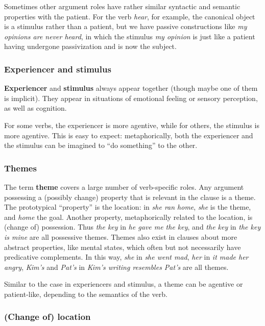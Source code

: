 \documentclass{article}
\newcommand*{\concept}[1]{\textbf{#1}}
\newcommand*{\corpus}[1]{\emph{#1}}
\begin{document}
Sometimes other argument roles have rather similar syntactic and semantic properties with the patient.
For the verb \corpus{hear}, for example,
the canonical object is a stimulus rather than a patient,
but we have passive constructions like \corpus{my opinions are never heard},
in which the stimulus \corpus{my opinion} is just like 
a patient having undergone passivization and is now the subject.

\subsubsection{Experiencer and stimulus}

\concept{Experiencer} and \concept{stimulus} always appear together (though maybe one of them is implicit).
They appear in situations of emotional feeling or sensory perception, as well as cognition.

For some verbs, the experiencer is more agentive, while for others, the stimulus is more agentive.
This is easy to expect:
metaphorically, both the experiencer and the stimulus can be imagined to ``do something'' to the other.

\subsubsection{Themes}

The term \concept{theme} covers a large number of verb-specific roles.
Any argument possessing a (possibly change) property that is relevant in the clause is a theme.
The prototypical ``property'' is the location: 
in \corpus{she ran home}, \corpus{she} is the theme, and \corpus{home} the goal.
Another property, metaphorically related to the location, is (change of) possession.
Thus \corpus{the key} in \corpus{he gave me the key}, and \corpus{the key} in \corpus{the key is mine}
are all possessive themes.
Themes also exist in clauses about more abstract properties, like mental states, 
which often but not necessarily have predicative complements.
In this way, 
\corpus{she} in \corpus{she went mad}, 
\corpus{her} in \corpus{it made her angry},
\corpus{Kim's} and \corpus{Pat's} in \corpus{Kim's writing resembles Pat's}
are all themes.

Similar to the case in experiencers and stimulus,
a theme can be agentive or patient-like, depending to the semantics of the verb.

\subsubsection{(Change of) location}
\end{document}
